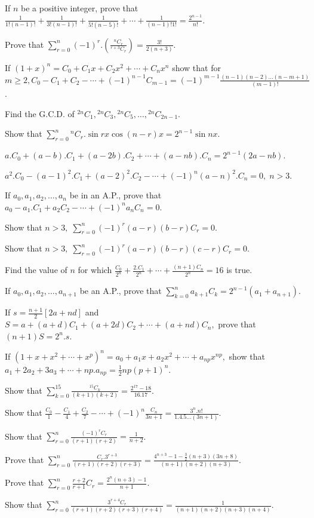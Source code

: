 \item If $n$ be a positive integer, prove that $\frac{1}{1!(n - 1)!} + \frac{1}{3!(n - 1)!} + \frac{1}{5!(n - 5)!} + \cdots +
  \frac{1}{(n - 1)!1!} = \frac{2^{n - 1}}{n!}$.
\item Prove that $\displaystyle\sum_{r=0}^n(-1)^r.\left(\frac{{}^nC_r}{{}^{r + 3}C_r}\right) = \frac{3!}{2(n + 3)}$.
\item If $(1 + x)^n = C_0 + C_1x + C_2x^2 + \cdots + C_nx^n$ show that for $m\geq 2, C_0 - C_1 + C_2 - \cdots + (-1)^{n - 1}C_{m -
  1} = (-1)^{m - 1}\frac{(n- 1)(n- 2)\ldots(n - m + 1)}{(m - 1)!}$.
\item Find the G.C.D. of ${}^{2n}C_1, {}^{2n}C_3, {}^{2n}C_5, \ldots, {}^{2n}C_{2n - 1}$.
\item Show that $\displaystyle\sum_{r=0}^n{}^nC_r.\sin rx\cos(n - r)x = 2^{n- 1}\sin nx$.
\item $a.C_0 + (a - b).C_1 + (a - 2b).C_2 + \cdots + (a - nb).C_n = 2^{n - 1}(2a - nb)$.
\item $a^2.C_0 - (a - 1)^2.C_1 + (a - 2)^2.C_2 - \cdots + (-1)^n(a - n)^2.C_n = 0,\;n>3$.
\item If $a_0, a_1, a_2, \ldots, a_n$ be in an A.P., prove that $a_0 - a_1.C_1 + a_2C_2 - \cdots + (-1)^na_nC_n = 0$.
\item Show that $n>3,\;\displaystyle\sum_{r=0}^n(-1)^r(a - r)(b - r)C_r = 0$.
\item Show that $n>3,\;\displaystyle\sum_{r=0}^n(-1)^r(a - r)(b - r)(c - r)C_r = 0$.
\item Find the value of $n$ for which $\frac{C_0}{2^n} + \frac{2.C_1}{2^n} + \cdots + \frac{(n + 1)C_n}{2^n} = 16$ is true.
\item If $a_0, a_1, a_2, \ldots, a_{n + 1}$ be an A.P., prove that $\displaystyle\sum_{k=0}^na_{k + 1}C_k = 2^{n - 1}(a_1 + a_{n +
  1})$.
\item If $s = \frac{n + 1}{2}[2a + nd]$ and $S = a + (a + d)C_1 +(a+ 2d)C_2 + \cdots + (a +nd)C_n,$ prove that $(n + 1)S = 2^n.s$.
\item If $(1 + x + x^2 + \cdots + x^p)^n = a_0 + a_1x + a_2x^2 + \cdots + a_{np}x^{np},$ show that $a_1 + 2a_2 + 3a_3 + \cdots +
  np.a_{np} = \frac{1}{2}np(p + 1)^n$.
\item Show that $\displaystyle\sum_{k=0}^{15}\frac{{}^{15}C_k}{(k + 1)(k + 2)} = \frac{2^{17} - 18}{16.17}$.
\item Show that $\frac{C_0}{1} - \frac{C_1}{4} + \frac{C_2}{7} - \cdots + (-1)^n\frac{C_n}{3n + 1} = \frac{3^n.n!}{1.4.5\ldots(3n +
  1)}$.
\item Show that $\displaystyle\sum_{r=0}^n\frac{(-1)^rC_r}{(r + 1)(r + 2)} = \frac{1}{n + 2}$.
\item Prove that $\displaystyle\sum_{r=0}^n\frac{C_r.3^{r + 3}}{(r + 1)(r + 2)(r + 3)} = \frac{4^{n + 3} - 1 - \frac{3}{2}(n +
  3)(3n + 8)}{(n + 1)(n + 2)(n + 3)}$.
\item Prove that $\displaystyle\sum_{r=0}^n\frac{r + 2}{r + 1}C_r = \frac{2^n(n + 3) - 1}{n + 1}$.
\item Show that $\displaystyle\sum_{r=0}^n\frac{3^{r + 4}C_r}{(r + 1)(r + 2)(r + 3)(r + 4)} = \frac{1}{(n + 1)(n + 2)(n + 3)(n +
  4)}.$

